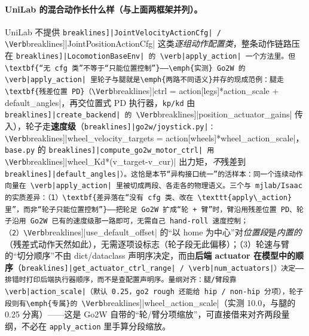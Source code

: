 \paragraph{UniLab 的混合动作长什么样（与上面两框架并列）。}UniLab 不提供 \Verb[breaklines]|JointVelocityActionCfg| / \Verb[breaklines]|JointPositionActionCfg| 这类\emph{逐组动作配置类}，整条动作链路压在 \Verb[breaklines]|LocomotionBaseEnv| 的 \verb|apply_action| 一个方法里。但\textbf{“无 cfg 类”不等于“只能位置控制”}——\emph{实测} Go2W 的 \verb|apply_action| 里轮子与腿就是\emph{两路不同语义}并存的现成范例：腿走\textbf{残差位置 PD}（\Verb[breaklines]|ctrl = action[legs]*action_scale + default_angles|，再交位置式 PD 执行器，\verb|kp/kd| 由 \Verb[breaklines]|create_backend| 的 \Verb[breaklines]|position_actuator_gains| 传入），轮子走\textbf{速度级}（\Verb[breaklines]|go2w/joystick.py|：\Verb[breaklines]|wheel_velocity_targets = action[wheels]*wheel_action_scale|，\verb|base.py| 的 \Verb[breaklines]|compute_go2w_motor_ctrl| 用 \Verb[breaklines]|wheel_Kd*(v_target-v_cur)| 出力矩，\emph{不}残差到 \Verb[breaklines]|default_angles|）。这恰是本节“异构接口统一”的活样本：同一个连续动作向量在 \verb|apply_action| 里被切成两段、各走各的物理语义。三个与 mjlab/Isaac 的实质差异：（1）\textbf{差异落在“没有 cfg 类、改在 \texttt{apply\_action} 里”，而非“轮子只能位置控制”}——把轮足 Go2W 扩成“轮 + 臂”时，臂沿用残差位置 PD、轮子沿用 Go2W 已有的速度级那一路即可，无需自己 hand-roll 速度控制；（2）\Verb[breaklines]|use_default_offset| 的“以 home 为中心”对\emph{位置段}是\emph{内置的}（残差式动作天然如此），无需逐项设标志（轮子段无此偏移）；（3）轮速与臂的“切分顺序”不由 dict/dataclass 声明序决定，而由\textbf{后端 actuator 在模型中的顺序}（\Verb[breaklines]|get_actuator_ctrl_range| / \verb|num_actuators|）决定——排错时打印后端执行器顺序，而不是查配置声明序。量纲对齐：腿/臂段靠 \verb|action_scale|（默认 0.25，go2 rough 还能给 hip / non-hip 分项），轮子段则有\emph{专属}的 \Verb[breaklines]|wheel_action_scale|（实测 10.0，与腿的 0.25 分离）——这是 Go2W 自带的“轮/臂分项缩放”，可直接借来对齐两段量纲，不必在 \verb|apply_action| 里手算分段缩放。

